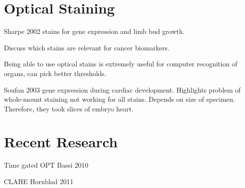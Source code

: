 \documentclass[12pt]{article}
\begin{document}
\section{Optical Staining}
Sharpe 2002 stains for gene expression and limb bud growth. 

Discuss which stains are relevant for cancer biomarkers. \cite{Hanahan:2011gua}

Being able to use optical stains is extremely useful for computer recognition of organs, can pick better thresholds. \cite{Sharpe:2003cm}

Soufan 2003 \cite{Soufan:2003cd} gene expression during cardiac development. 
Highlights problem of whole-mount staining not working for all stains. Depends on size of specimen. Therefore, they took slices of embryo heart.


\section{Recent Research}
 Time gated OPT Bassi 2010 \cite{Bassi:2010}
 
 CLAHE Hornblad 2011 \cite{Hornblad:2011fh}



\end{document}
